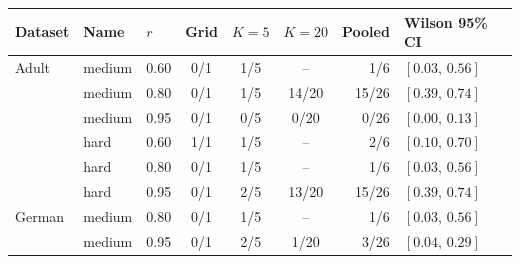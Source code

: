 \begin{tabular}{@{}lllcccrl@{}}
\toprule
Dataset & Name & $r$ & Grid & $K{=}5$ & $K{=}20$ & Pooled & Wilson 95\% CI \\
\midrule
Adult & medium & 0.60 & 0/1 & 1/5 & -- & 1/6 & $[0.03,\,0.56]$ \\
 & medium & 0.80 & 0/1 & 1/5 & 14/20 & 15/26 & $[0.39,\,0.74]$ \\
 & medium & 0.95 & 0/1 & 0/5 & 0/20 & 0/26 & $[0.00,\,0.13]$ \\
 & hard & 0.60 & 1/1 & 1/5 & -- & 2/6 & $[0.10,\,0.70]$ \\
 & hard & 0.80 & 0/1 & 1/5 & -- & 1/6 & $[0.03,\,0.56]$ \\
 & hard & 0.95 & 0/1 & 2/5 & 13/20 & 15/26 & $[0.39,\,0.74]$ \\
\addlinespace
German & medium & 0.80 & 0/1 & 1/5 & -- & 1/6 & $[0.03,\,0.56]$ \\
 & medium & 0.95 & 0/1 & 2/5 & 1/20 & 3/26 & $[0.04,\,0.29]$ \\
\bottomrule
\end{tabular}
